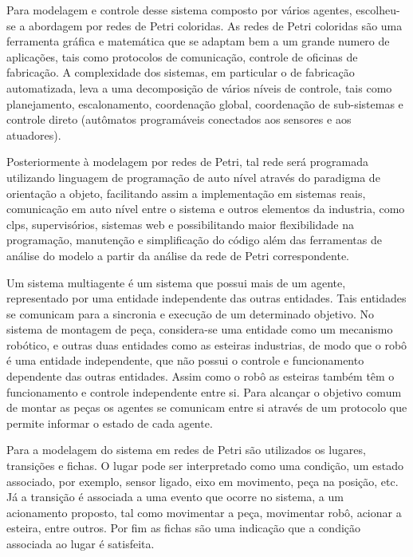 Para modelagem e controle desse sistema composto por vários agentes, escolheu-se a abordagem por redes de Petri coloridas. As redes de Petri  coloridas são uma ferramenta gráfica e matemática que se adaptam bem a um grande numero de aplicações, tais como protocolos de comunicação, controle de oficinas de fabricação. 
A complexidade dos sistemas, em particular o de fabricação automatizada, leva a uma decomposição de vários níveis de controle, tais como planejamento, escalonamento, coordenação global, coordenação de sub-sistemas e controle direto (autômatos programáveis conectados aos sensores e aos atuadores). %

Posteriormente à modelagem por redes de Petri, tal rede será programada utilizando linguagem de programação de auto nível através do paradigma de orientação a objeto, facilitando assim a implementação em sistemas reais, comunicação em auto nível entre o sistema e outros elementos da industria, como clps, supervisórios, sistemas web e possibilitando maior flexibilidade na programação, manutenção e simplificação do código além das ferramentas de análise do modelo a partir da análise da rede de Petri correspondente.

Um sistema multiagente é um sistema que possui mais de um agente, representado por uma entidade independente das outras entidades. Tais entidades se comunicam para a sincronia e execução de um determinado objetivo. No sistema de montagem de peça, considera-se uma entidade como um mecanismo robótico, e outras duas entidades como as esteiras industrias, de modo que o robô é uma entidade independente, que não possui o controle e funcionamento dependente das outras entidades. Assim como o robô as esteiras também têm o funcionamento e controle independente entre si. Para alcançar o objetivo comum de montar as peças os agentes se comunicam entre si através de um protocolo que permite informar o estado de cada agente.

Para a modelagem do sistema em redes de Petri são utilizados os lugares, transições e fichas. O lugar pode ser interpretado como uma condição, um estado associado, por exemplo, sensor ligado, eixo em movimento, peça na posição, etc. Já a transição é associada a uma evento que ocorre no sistema, a um acionamento proposto, tal como movimentar a peça, movimentar robô, acionar a esteira, entre outros. Por fim as fichas são uma indicação que a condição associada ao lugar é satisfeita.

